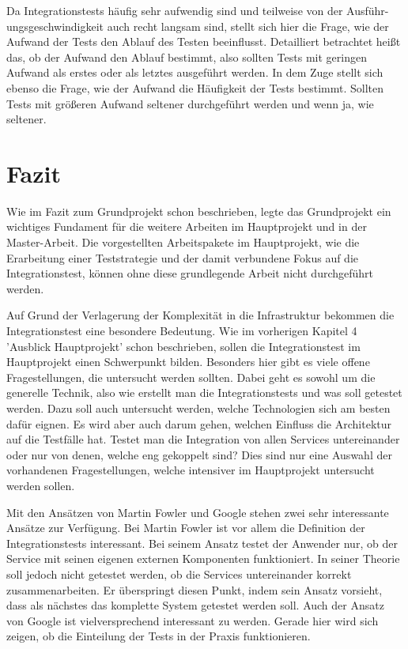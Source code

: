 \documentclass{llncs}
\begin{document}
Da Integrationstests häufig sehr aufwendig sind und teilweise von der Ausführ-ungsgeschwindigkeit auch recht langsam sind, stellt sich hier die Frage, wie der Aufwand der Tests den Ablauf des Testen beeinflusst. Detailliert betrachtet heißt das, ob der Aufwand den Ablauf bestimmt, also sollten Tests mit geringen Aufwand als erstes oder als letztes ausgeführt werden. In dem Zuge stellt sich ebenso die Frage, wie der Aufwand die Häufigkeit der Tests bestimmt. Sollten Tests mit größeren Aufwand seltener durchgeführt werden und wenn ja, wie seltener.

\section{Fazit}
Wie im Fazit zum Grundprojekt schon beschrieben, legte das Grundprojekt ein wichtiges Fundament für die weitere Arbeiten im Hauptprojekt und in der Master-Arbeit. Die vorgestellten Arbeitspakete im Hauptprojekt, wie die Erarbeitung einer Teststrategie und der damit verbundene Fokus auf die Integrationstest, können ohne diese grundlegende Arbeit nicht durchgeführt werden.

Auf Grund der Verlagerung der Komplexität in die Infrastruktur bekommen die Integrationstest eine besondere Bedeutung. Wie im vorherigen Kapitel 4 'Ausblick Hauptprojekt' schon beschrieben, sollen die Integrationstest im Hauptprojekt einen Schwerpunkt bilden. Besonders hier gibt es viele offene Fragestellungen, die untersucht werden sollten. Dabei geht es sowohl um die generelle Technik, also wie erstellt man die Integrationstests und was soll getestet werden. Dazu soll auch untersucht werden, welche Technologien sich am besten dafür eignen. Es wird aber auch darum gehen, welchen Einfluss die Architektur auf die Testfälle hat. Testet man die Integration von allen Services untereinander oder nur von denen, welche eng gekoppelt sind? Dies sind nur eine Auswahl der vorhandenen Fragestellungen, welche intensiver im Hauptprojekt untersucht werden sollen.

Mit den Ansätzen von Martin Fowler und Google stehen zwei sehr interessante Ansätze zur Verfügung. Bei Martin Fowler ist vor allem die Definition der Integrationstests interessant. Bei seinem Ansatz testet der Anwender nur, ob der Service mit seinen eigenen externen Komponenten funktioniert. In seiner Theorie soll jedoch nicht getestet werden, ob die Services untereinander korrekt zusammenarbeiten. Er überspringt diesen Punkt, indem sein Ansatz vorsieht, dass als nächstes das komplette System getestet werden soll. Auch der Ansatz von Google ist vielversprechend interessant zu werden. Gerade hier wird sich zeigen, ob die Einteilung der Tests in der Praxis funktionieren. 



\end{document}
